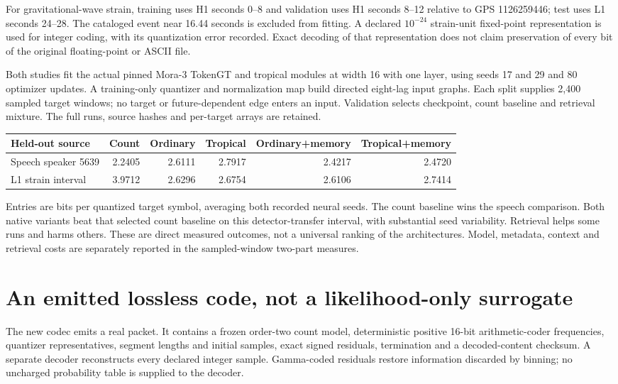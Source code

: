 For gravitational-wave strain, training uses H1 seconds 0--8 and validation uses H1 seconds 8--12 relative to GPS 1126259446; test uses L1 seconds 24--28. The cataloged event near 16.44 seconds is excluded from fitting. A declared $10^{-24}$ strain-unit fixed-point representation is used for integer coding, with its quantization error recorded. Exact decoding of that representation does not claim preservation of every bit of the original floating-point or ASCII file.

Both studies fit the actual pinned Mora-3 TokenGT and tropical modules at width 16 with one layer, using seeds 17 and 29 and 80 optimizer updates. A training-only quantizer and normalization map build directed eight-lag input graphs. Each split supplies 2,400 sampled target windows; no target or future-dependent edge enters an input. Validation selects checkpoint, count baseline and retrieval mixture. The full runs, source hashes and per-target arrays are retained.

\begin{center}
\begin{tabular}{lrrrrr}
\toprule
Held-out source & Count & Ordinary & Tropical & Ordinary+memory & Tropical+memory\\
\midrule
Speech speaker 5639 & 2.2405 & 2.6111 & 2.7917 & 2.4217 & 2.4720\\
L1 strain interval & 3.9712 & 2.6296 & 2.6754 & 2.6106 & 2.7414\\
\bottomrule
\end{tabular}
\end{center}
Entries are bits per quantized target symbol, averaging both recorded neural seeds. The count baseline wins the speech comparison. Both native variants beat that selected count baseline on this detector-transfer interval, with substantial seed variability. Retrieval helps some runs and harms others. These are direct measured outcomes, not a universal ranking of the architectures. Model, metadata, context and retrieval costs are separately reported in the sampled-window two-part measures.

\section{An emitted lossless code, not a likelihood-only surrogate}

The new codec emits a real packet. It contains a frozen order-two count model, deterministic positive 16-bit arithmetic-coder frequencies, quantizer representatives, segment lengths and initial samples, exact signed residuals, termination and a decoded-content checksum. A separate decoder reconstructs every declared integer sample. Gamma-coded residuals restore information discarded by binning; no uncharged probability table is supplied to the decoder.

